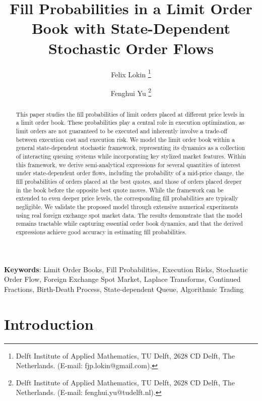 \documentclass[11pt]{article}
\begin{document}
\title{\bf Fill Probabilities in a Limit Order Book with State-Dependent Stochastic Order Flows}

\author{Felix Lokin
\thanks{ Delft Institute of Applied Mathematics, TU Delft, 2628 CD Delft, The Netherlands.
(E-mail: fjp.lokin@gmail.com).}
\and Fenghui Yu
\thanks{ Delft Institute of Applied Mathematics, TU Delft, 2628 CD Delft, The Netherlands.
(E-mail: fenghui.yu@tudelft.nl).}}

\maketitle

\begin{abstract}

This paper studies the fill probabilities of limit orders placed at different price levels in a limit order book. These probabilities play a central role in execution optimization, as limit orders are not guaranteed to be executed and inherently involve a trade-off between execution cost and execution risk. We model the limit order book within a general state-dependent stochastic framework, representing its dynamics as a collection of interacting queuing systems while incorporating key stylized market features. Within this framework, we derive semi-analytical expressions for several quantities of interest under state-dependent order flows, including the probability of a mid-price change, the fill probabilities of orders placed at the best quotes, and those of orders placed deeper in the book before the opposite best quote moves. While the framework can be extended to even deeper price levels, the corresponding fill probabilities are typically negligible. We validate the proposed model through extensive numerical experiments using real foreign exchange spot market data. The results demonstrate that the model remains tractable while capturing essential order book dynamics, and that the derived expressions achieve good accuracy in estimating fill probabilities.
\end{abstract}

\textbf{Keywords}: Limit Order Books, Fill Probabilities, Execution Risks, Stochastic Order Flow, Foreign Exchange Spot Market, Laplace Transforms, Continued Fractions, Birth-Death Process, State-dependent Queue, Algorithmic Trading

\section{Introduction}
\end{document}
